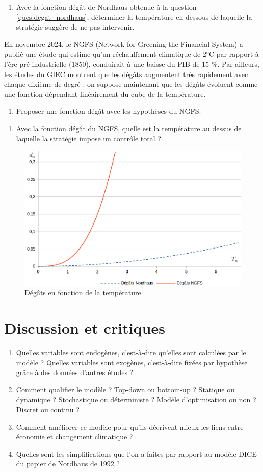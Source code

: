 \documentclass[12pt]{article}
\newcommand{\ques}[1]{\begin{enumerate}[resume]
\item  #1
\end{enumerate}}
\newcommand{\rep}[1]{\textit{Réponse :} #1 \\}
\renewcommand{\rep}[1]{ }
\theoremstyle{remark}
\begin{document}
\ques{Avec la fonction dégât de Nordhaus obtenue à la question \ref{ques:degat_nordhaus}, déterminer la température en dessous de laquelle la stratégie suggère de ne pas intervenir.}
\rep{Lecture graphique ou calculer $3\times \sqrt{0,05/0,0133}=5,8$ °C.}

En novembre 2024, le NGFS (Network for Greening the Financial System) a publié une étude qui estime qu'un réchauffement climatique de 2°C par rapport à l'ère pré-industrielle (1850), conduirait à une baisse du PIB de 15 \%. Par ailleurs, les études du GIEC montrent que les dégâts augmentent très rapidement avec chaque dixième de degré : on suppose maintenant que les dégâts évoluent comme une fonction dépendant linéairement du cube de la température.
\ques{Proposer une fonction dégât avec les hypothèses du NGFS.}
\rep{\begin{equation*} d_n = 0,15 \left(\frac{T_n}{2}\right)^3\end{equation*}}

\ques{Avec la fonction dégât du NGFS, quelle est la température au dessus de laquelle la stratégie impose un contrôle total ?}
\rep{Lecture graphique ou calculer $2\times (0,05/0,15)^{1/3}=1,39$ °C.}


\begin{figure}[h]
\centering
\includegraphics[scale=0.35]{images/fonction_degats.png}
\caption{Dégâts en fonction de la température}
\end{figure}

\section{Discussion et critiques}
\begin{enumerate}[resume]
\item Quelles variables sont endogènes, c'est-à-dire qu'elles sont calculées par le modèle ? Quelles variables sont exogènes, c'est-à-dire fixées par hypothèse grâce à des données d'autres études ?
\item Comment qualifier le modèle ? Top-down ou bottom-up ? Statique ou dynamique ? Stochastique ou déterministe ? Modèle d'optimisation ou non ? Discret ou continu ?
\item Comment améliorer ce modèle pour qu'ils décrivent mieux les liens entre économie et changement climatique ?
\item Quelles sont les simplifications que l'on a faites par rapport au modèle DICE du papier de Nordhaus de 1992 ?
\end{enumerate}
\end{document}
